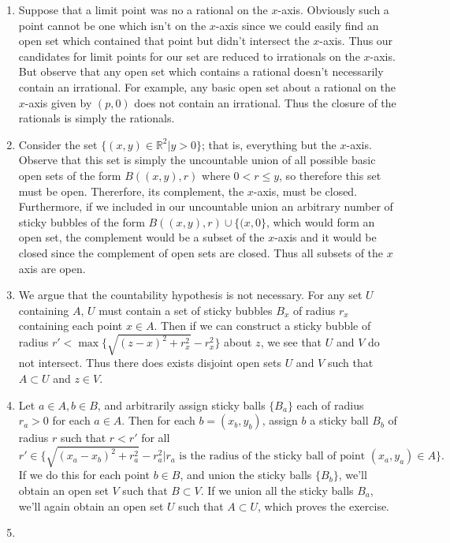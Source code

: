 \documentclass[a4paper,12pt,twoside]{hmcpset}
\begin{document}
\begin{solution}
    \begin{enumerate}
        \item Suppose that a limit point was no a rational on the $x$-axis.
        Obviously such a point cannot be one which isn't on the $x$-axis since
        we could easily find an open set which contained that point but didn't
        intersect the $x$-axis. Thus our candidates for limit points for our
        set are reduced to irrationals on the $x$-axis. But observe that any
        open set which contains a rational doesn't necessarily contain an
        irrational. For example, any basic open set about a rational on the
        $x$-axis given by $(p, 0)$ does not contain an irrational. Thus the
        closure of the rationals is simply the rationals.
    
        \item Consider the set $\{(x,y) \in \mathbb{R}^2 | y > 0\}$; that is,
        everything but the $x$-axis. Observe that this set is simply the
        uncountable union of all possible basic open sets of the form $B((x,
        y), r)$ where $0 < r \le y$, so therefore this set must be open.
        Thererfore, its complement, the $x$-axis, must be closed. Furthermore,
        if we included in our uncountable union an arbitrary number of sticky
        bubbles of the form $B((x, y), r) \cup \{(x, 0\}$, which would form an
        open set, the complement would be a subset of the $x$-axis and it
        would be closed since the complement of open sets are closed. Thus all
        subsets of the $x$ axis are open.
    
        \item We argue that the countability hypothesis is not necessary. For any
        set $U$ containing $A$, $U$ must contain a set of sticky bubbles $B_x$
        of radius $r_x$ containing each point $x \in A$. Then if we can
        construct a sticky bubble of radius $r' < \max\{\sqrt{(z-x)^2 + r_x^2}
        - r_x^2\}$ about $z$, we see that $U$ and $V$ do not intersect. Thus
        there does exists disjoint open sets $U$ and $V$ such that $A \subset
        U$ and $z \in V$.
    
        \item Let $a \in A, b \in B$, and arbitrarily assign sticky balls
        $\{B_a\}$ each of radius $r_a > 0$ for each $a \in A.$ Then for each
        $b = (x_b, y_b)$, assign $b$ a sticky ball $B_b$ of radius $r$ such
        that $r < r'$ for all $$r' \in \{\sqrt{(x_a - x_b)^2 + r_a^2} - r_a^2
        | r_a \text{ is the radius of the sticky ball of point } (x_a, y_a)
        \in A\}.$$ If we do this for each point $b \in B$, and union the
        sticky balls $\{B_b\}$, we'll obtain an open set $V$ such that $B
        \subset V$. If we union all the sticky balls $B_a$, we'll again obtain
        an open set $U$ such that $A \subset U$, which proves the
        exercise.
        
        \item 
    \end{enumerate}    
\end{solution}
\end{document}
